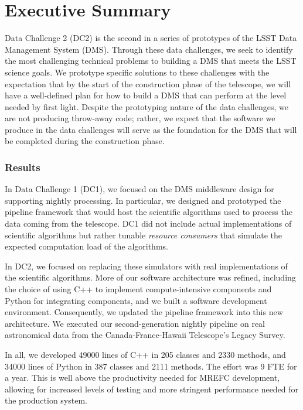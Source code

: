 \section*{Executive Summary}

Data Challenge 2 (DC2) is the second in a series of prototypes of the LSST Data Management System (DMS).  Through these data challenges, we seek to identify the most challenging technical problems to building a DMS that meets the LSST science goals.  We prototype specific solutions to these challenges with the expectation that by the start of the construction phase of the telescope, we will have a well-defined plan for how to build a DMS that can perform at the level needed by first light.  Despite the prototyping nature of the data challenges, we are not producing throw-away code; rather, we expect that the software we produce in the data challenges will serve as the foundation for the DMS that will be completed during the construction phase.

\subsubsection*{Results}

In Data Challenge 1 (DC1), we focused on the DMS middleware design for supporting nightly processing.  In particular, we designed and prototyped the pipeline framework that would host the scientific algorithms used to process the data coming from the telescope.  DC1 did not include actual implementations of scientific algorithms but rather tunable \textit{resource consumers} that simulate the expected computation load of the algorithms.

In DC2, we focused on replacing these simulators with real implementations of the scientific algorithms.  More of our software architecture was refined, including the choice of using C++ to implement compute-intensive components and Python for integrating components, and we built a software development environment.  Consequently, we updated the pipeline framework into this new architecture.  We executed our second-generation nightly pipeline on real astronomical data from the Canada-France-Hawaii Telescope's Legacy Survey.

In all, we developed 49000 lines of C++ in 205 classes and 2330 methods, and 34000 lines of Python in 387 classes and 2111 methods.  The effort was 9 FTE for a year.  This is well above the productivity needed for MREFC development, allowing for increased levels of testing and more stringent performance needed for the production system.

